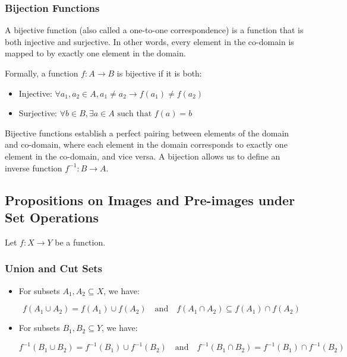 \subsubsection{Bijection Functions}

A bijective function (also called a one-to-one correspondence) is a 
function that is both injective and surjective. In other words, every 
element in the co-domain is mapped to by exactly one element in the domain.

Formally, a function \(f: A \to B\) is bijective if it is both:

\begin{itemize}

	\item Injective: \(\forall a_1, a_2 \in A, a_1 \neq a_2 \to f(a_1) \neq f(a_2)\)

	\item Surjective: \(\forall b \in B, \exists a \in A \text{ such that } f(a) = b\)

\end{itemize}

Bijective functions establish a perfect pairing between elements of the domain and co-domain, where each 
element in the domain corresponds to exactly one element in the co-domain, and vice versa. A bijection 
allows us to define an inverse function \(f^{-1}: B \to A\).

\subsection{Propositions on Images and Pre-images under Set Operations}

Let \( f : X \to Y \) be a function.

\subsubsection{Union and Cut Sets}

\begin{itemize}

	\item For subsets \( A_1, A_2 \subseteq X \), we have:

	      \[
		      f(A_1 \cup A_2) = f(A_1) \cup f(A_2)
		      \quad \text{and} \quad
		      f(A_1 \cap A_2) \subseteq f(A_1) \cap f(A_2)
	      \]

	\item For subsets \( B_1, B_2 \subseteq Y \), we have:
	      
	      \[
		      f^{-1}(B_1 \cup B_2) = f^{-1}(B_1) \cup f^{-1}(B_2)
		      \quad \text{and} \quad
		      f^{-1}(B_1 \cap B_2) = f^{-1}(B_1) \cap f^{-1}(B_2)
	      \]
\end{itemize}

